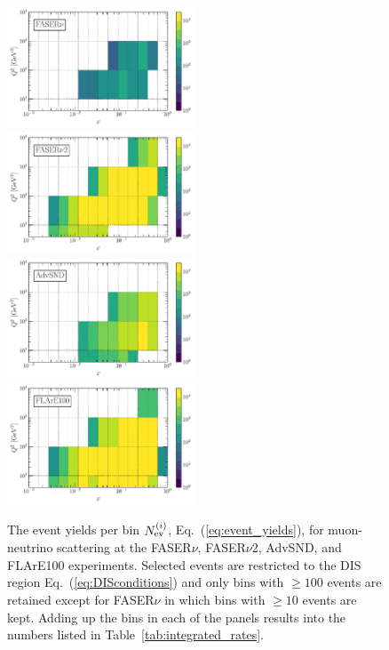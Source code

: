 \begin{figure}[t]
    \centering
    \includegraphics[width=0.495\textwidth]{plots/FPF-FASERv.pdf}
    \includegraphics[width=0.495\textwidth]{plots/FPF-FASERv2.pdf}
    \includegraphics[width=0.495\textwidth]{plots/FPF-AdvSND.pdf}
    \includegraphics[width=0.495\textwidth]{plots/FPF-FLArE100.pdf}
    \caption{
    	\small The event yields per bin $N_{\rm ev}^{(i)}$,  Eq.~(\ref{eq:event_yields}), for 
    	muon-neutrino scattering at the FASER$\nu$, FASER$\nu$2, AdvSND, and FLArE100  experiments.
   		Selected events are restricted to the DIS region Eq.~(\ref{eq:DISconditions})
   		and only bins with $\ge 100$ events are retained except for FASER$\nu$ in which
   		bins with $\ge 10$ events are kept.
		Adding up the bins in each of the panels results into the numbers listed in
		Table~\ref{tab:integrated_rates}.}
    \label{fig:fasernu2_muon}
\end{figure}

